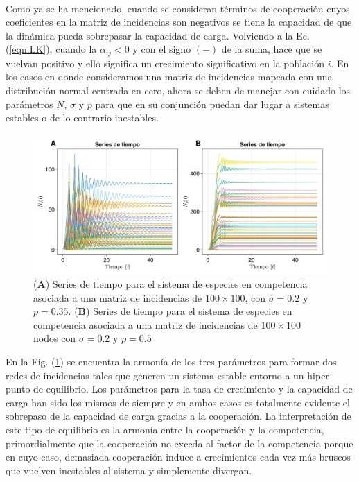 \\
Como ya se ha mencionado, cuando se consideran términos de cooperación cuyos coeficientes en la matriz de incidencias son negativos se tiene la capacidad de que la dinámica pueda sobrepasar la capacidad de carga. Volviendo a la Ec. (\ref{eqn:LK}), cuando la $\alpha_{ij}<0$ y con el signo $(-)$ de la suma, hace que se vuelvan positivo y ello significa un crecimiento significativo en la población $i$. En los casos en donde consideramos una matriz de incidencias mapeada con una distribución normal centrada en cero, ahora se deben de manejar con cuidado los parámetros $N$, $\sigma$ y $p$ para que en su conjunción puedan dar lugar a sistemas estables o de lo contrario inestables.
\begin{figure}[h!]
	\centering
	\includegraphics[scale=0.23]{../Imagenes/Series de Tiempo LK100}
	\caption{(\textbf{A}) Series de tiempo para el sistema de especies en competencia asociada a una matriz de incidencias de $100\times100$, con $\sigma=0.2$ y $p=0.35$. (\textbf{B}) Series de tiempo para el sistema de especies en competencia asociada a una matriz de incidencias de $100\times 100$ nodos con $\sigma=0.2$ y $p=0.5$}
	\label{fig:SeriesdeTiempoLK100}
\end{figure}
En la Fig. (\ref{fig:SeriesdeTiempoLK100}) se encuentra la armonía de los tres parámetros para formar dos redes de incidencias tales que generen un sistema estable entorno a un hiper punto de equilibrio. Los parámetros para la tasa de crecimiento y la capacidad de carga han sido los mismos de siempre y en ambos casos es totalmente evidente el sobrepaso de la capacidad de carga gracias a la cooperación. La interpretación de este tipo de equilibrio es la armonía entre la cooperación y la competencia, primordialmente que la cooperación no exceda al factor de la competencia porque en cuyo caso, demasiada cooperación induce a crecimientos cada vez más bruscos que vuelven inestables al sistema y simplemente divergan.